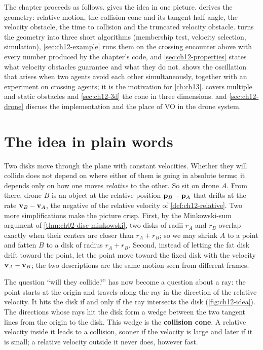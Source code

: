 The chapter proceeds as follows.  gives the idea in
one picture.  derives the geometry: relative motion,
the collision cone and its tangent half-angle, the velocity obstacle, the time
to collision and the truncated velocity obstacle. 
turns the geometry into three short algorithms (membership test, velocity
selection, simulation), \cref{sec:ch12-example} runs them on the crossing
encounter above with every number produced by the chapter's code, and
\cref{sec:ch12-properties} states what velocity obstacles guarantee and what
they do not.  shows the oscillation that arises when
two agents avoid each other simultaneously, together with an experiment on
crossing agents; it is the motivation for \cref{ch:ch13}.
 covers multiple and static obstacles and
\cref{sec:ch12-3d} the cone in three dimensions. 
and \cref{sec:ch12-drone} discuss the implementation and the place of VO in the
drone system.

\section{The idea in plain words}
\label{sec:ch12-intuition}

Two disks move through the plane with constant velocities. Whether they will
collide does not depend on where either of them is going in absolute terms; it
depends only on how one moves \emph{relative} to the other. So sit on drone
$A$. From there, drone $B$ is an object at the relative position
$\mathbf{p}_B - \mathbf{p}_A$ that drifts at the rate $\mathbf{v}_B - \mathbf{v}_A$, the negative of
the relative velocity of \cref{def:ch12-relative}.
Two more simplifications make the picture crisp. First, by the Minkowski-sum
argument of \cref{thm:ch02-disc-minkowski}, two disks of radii $r_A$ and $r_B$ overlap exactly
when their centers are closer than $r_A + r_B$; so we may shrink $A$ to a point
and fatten $B$ to a disk of radius $r_A + r_B$. Second, instead of letting the
fat disk drift toward the point, let the point move toward the fixed disk
with the velocity $\mathbf{v}_A - \mathbf{v}_B$; the two descriptions are the same motion
seen from different frames.

The question ``will they collide?'' has now become a question about a ray: the
point starts at the origin and travels along the ray in the direction of the
relative velocity. It hits the disk if and only if the ray intersects the disk
(\cref{fig:ch12-idea}). The directions whose rays hit the disk form a wedge
between the two tangent lines from the origin to the disk. This wedge is the
\textbf{collision cone}. A relative velocity inside it
leads to a collision, sooner if the velocity is large and later if it is small;
a relative velocity outside it never does, however fast.

